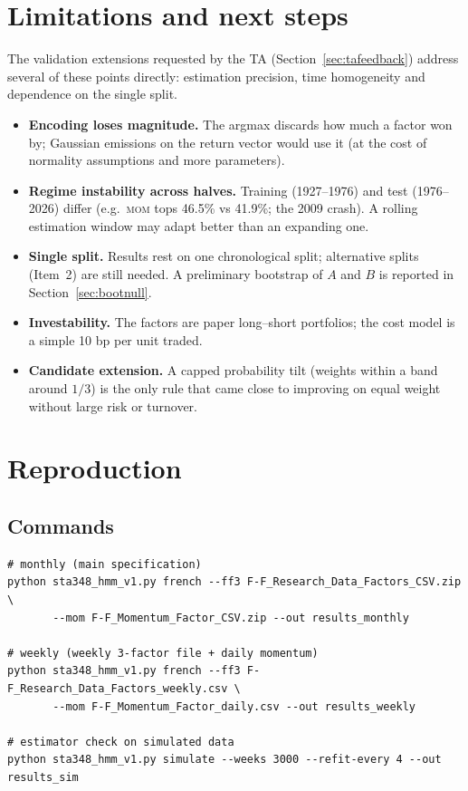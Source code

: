 \documentclass[11pt]{article}
\newcommand{\MOM}{\textsc{mom}}
\begin{document}
\section{Limitations and next steps}
The validation extensions requested by the TA (Section~\ref{sec:tafeedback}) address several of these points directly: estimation precision, time homogeneity and dependence on the single split.
\begin{itemize}
\item \textbf{Encoding loses magnitude.} The argmax discards how much a factor won by; Gaussian emissions on the return vector would use it (at the cost of normality assumptions and more parameters).
\item \textbf{Regime instability across halves.} Training (1927--1976) and test (1976--2026) differ (e.g.\ \MOM{} tops 46.5\% vs 41.9\%; the 2009 crash). A rolling estimation window may adapt better than an expanding one.
\item \textbf{Single split.} Results rest on one chronological split; alternative splits (Item~2) are still needed. A preliminary bootstrap of $A$ and $B$ is reported in Section~\ref{sec:bootnull}.
\item \textbf{Investability.} The factors are paper long--short portfolios; the cost model is a simple 10 bp per unit traded.
\item \textbf{Candidate extension.} A capped probability tilt (weights within a band around $1/3$) is the only rule that came close to improving on equal weight without large risk or turnover.
\end{itemize}

\appendix
\section{Reproduction}

\subsection*{Commands}
\begin{verbatim}
# monthly (main specification)
python sta348_hmm_v1.py french --ff3 F-F_Research_Data_Factors_CSV.zip \
       --mom F-F_Momentum_Factor_CSV.zip --out results_monthly

# weekly (weekly 3-factor file + daily momentum)
python sta348_hmm_v1.py french --ff3 F-F_Research_Data_Factors_weekly.csv \
       --mom F-F_Momentum_Factor_daily.csv --out results_weekly

# estimator check on simulated data
python sta348_hmm_v1.py simulate --weeks 3000 --refit-every 4 --out results_sim
\end{verbatim}
\end{document}
